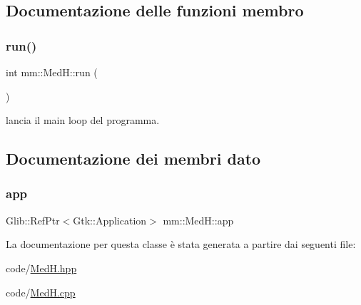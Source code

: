 \subsection{Documentazione delle funzioni membro}
\mbox{\label{classmm_1_1_med_h_aa34d2244a28a72dac6028e70317eb40b}} 
\subsubsection{\texorpdfstring{run()}{run()}}
{\footnotesize\ttfamily int mm\+::\+Med\+H\+::run (\begin{DoxyParamCaption}{ }\end{DoxyParamCaption})}



lancia il main loop del programma. 



\subsection{Documentazione dei membri dato}
\mbox{\label{classmm_1_1_med_h_a6bbf4476e1953d62562d35cb1f9c4218}} 
\subsubsection{\texorpdfstring{app}{app}}
{\footnotesize\ttfamily Glib\+::\+Ref\+Ptr$<$Gtk\+::\+Application$>$ mm\+::\+Med\+H\+::app}



La documentazione per questa classe è stata generata a partire dai seguenti file\+:\begin{DoxyCompactItemize}
\item 
code/\hyperlink{_med_h_8hpp}{Med\+H.\+hpp}\item 
code/\hyperlink{_med_h_8cpp}{Med\+H.\+cpp}\end{DoxyCompactItemize}
